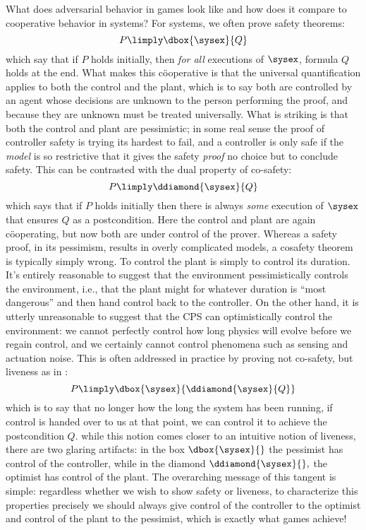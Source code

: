 What does adversarial behavior in games look like and how does it compare to cooperative behavior in systems?
For systems, we often prove safety theorems:
\[P \limply \dbox{\sysex}{Q}\]
which say that if $P$ holds initially, then \emph{for all} executions of $\sysex$, formula $Q$ holds at the end.
What makes this c\"ooperative is that the universal quantification applies to both the control and the plant, which is to say both are controlled by an agent whose decisions are unknown to the person performing the proof, and because they are unknown must be treated universally.
What is striking is that both the control and plant are pessimistic; in some real sense the proof of controller safety is trying its hardest to fail, and a controller is only safe if the \emph{model} is so restrictive  that it gives the safety \emph{proof} no choice but to conclude safety.
This can be contrasted with the dual property of co-safety:
\[P \limply \ddiamond{\sysex}{Q}\]
which says that if $P$ holds initially then there is always \emph{some} execution of $\sysex$ that ensures $Q$ as a postcondition.
Here the control and plant are again c\"ooperating, but now both are under control of the prover.
Whereas a safety proof, in its pessimism, results in overly complicated models, a cosafety theorem is typically simply wrong.
To control the plant is simply to control its duration.
It's entirely reasonable to suggest that the environment pessimistically controls the environment, i.e.,  that the plant might for whatever duration is ``most dangerous'' and then hand control back to the controller.
On the other hand, it is utterly unreasonable to suggest that the CPS can optimistically control the environment: we cannot perfectly control how long physics will evolve before we regain control, and we certainly cannot control phenomena such as sensing and actuation noise.
This is often addressed in practice by proving not co-safety, but liveness as in :
\[P \limply \dbox{\sysex}{\ddiamond{\sysex}{Q}}\]
which is to say that no longer how the long the system has been running, if control is handed over to us at that point, we can control it to achieve the postcondition $Q$.
while this notion comes closer to an intuitive notion of liveness, there are two glaring artifacts: in the box $\dbox{\sysex}{}$ the pessimist has control of the controller, while in the diamond $\ddiamond{\sysex}{},$ the optimist has control of the plant.
The overarching message of this tangent is simple: regardless whether we wish to show safety or liveness, to characterize this properties precisely we should always give control of the controller to the optimist and control of the plant to the pessimist, which is exactly what games achieve!

